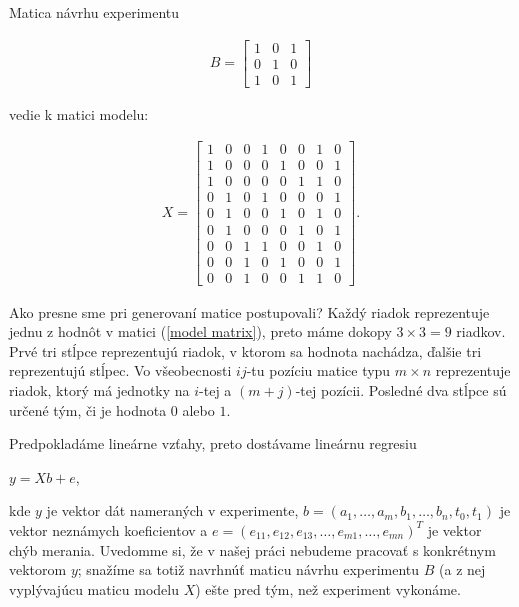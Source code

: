 Matica návrhu experimentu

\begin{align}
\label{model matrix}
B =
\begin{bmatrix}
1 & 0 & 1 \\
0 & 1 & 0 \\
1 & 0 & 1
\end{bmatrix}
\end{align}

vedie k matici modelu:

\begin{align}
\label{linear regression matrix}
X =
\begin{bmatrix}
1 & 0 & 0 & 1 & 0 & 0 & 1 & 0 \\
1 & 0 & 0 & 0 & 1 & 0 & 0 & 1 \\
1 & 0 & 0 & 0 & 0 & 1 & 1 & 0 \\
0 & 1 & 0 & 1 & 0 & 0 & 0 & 1 \\
0 & 1 & 0 & 0 & 1 & 0 & 1 & 0 \\
0 & 1 & 0 & 0 & 0 & 1 & 0 & 1 \\
0 & 0 & 1 & 1 & 0 & 0 & 1 & 0 \\
0 & 0 & 1 & 0 & 1 & 0 & 0 & 1 \\
0 & 0 & 1 & 0 & 0 & 1 & 1 & 0
\end{bmatrix}
.
\end{align}

Ako presne sme pri generovaní matice postupovali?
Každý riadok reprezentuje jednu z hodnôt v matici (\ref{model matrix}), preto máme dokopy $3 \times 3 = 9$ riadkov.
Prvé tri stĺpce reprezentujú riadok, v ktorom sa hodnota nachádza, ďalšie tri reprezentujú stĺpec.
Vo všeobecnosti $ij$-tu pozíciu matice typu $m \times n$ reprezentuje riadok,
ktorý má jednotky na $i$-tej a $(m + j)$-tej pozícii.
Posledné dva stĺpce sú určené tým, či je hodnota $0$ alebo $1$.

Predpokladáme lineárne vzťahy, preto dostávame lineárnu regresiu

\begin{center}
$
y = X b + e
$,
\end{center}

kde $y$ je vektor dát nameraných v experimente, $b = (a_1, \ldots, a_m, b_1, \ldots, b_n, t_0, t_1)$ je vektor neznámych koeficientov a 
$e = (e_{11}, e_{12}, e_{13}, \ldots, e_{m1}, \dots, e_{mn})^T$ je vektor chýb merania. 
Uvedomme si, že v našej práci nebudeme pracovať s konkrétnym vektorom $y$; 
snažíme sa totiž navrhnúť maticu návrhu experimentu $B$ (a z nej vyplývajúcu maticu modelu $X$) ešte pred tým, než experiment vykonáme.

